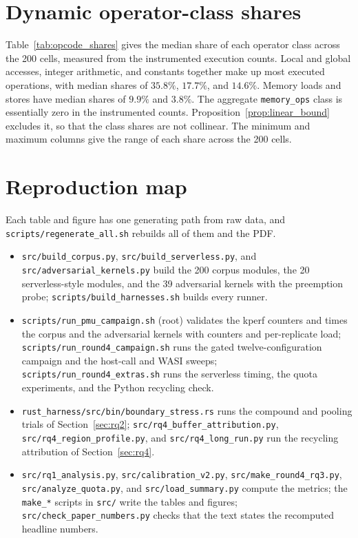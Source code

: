 \documentclass{ws-jcsc}
\begin{document}


\section{Dynamic operator-class shares}\label{app:opcodes}
Table~\ref{tab:opcode_shares} gives the median share of each operator class across the 200 cells, measured from the instrumented execution counts. Local and global accesses, integer arithmetic, and constants together make up most executed operations, with median shares of $35.8\%$, $17.7\%$, and $14.6\%$. Memory loads and stores have median shares of $9.9\%$ and $3.8\%$. The aggregate \texttt{memory\_ops} class is essentially zero in the instrumented counts. Proposition~\ref{prop:linear_bound} excludes it, so that the class shares are not collinear. The minimum and maximum columns give the range of each share across the 200 cells.



\section{Reproduction map}\label{app:repro}
Each table and figure has one generating path from raw data, and \texttt{scripts/regenerate\_all.sh} rebuilds all of them and the PDF.
{\sloppy
\begin{itemize}
\item \texttt{src/build\_corpus.py}, \texttt{src/build\_serverless.py}, and \texttt{src/adversarial\_kernels.py} build the 200 corpus modules, the 20 serverless-style modules, and the 39 adversarial kernels with the preemption probe; \texttt{scripts/build\_harnesses.sh} builds every runner.
\item \texttt{scripts/run\_pmu\_campaign.sh} (root) validates the kperf counters and times the corpus and the adversarial kernels with counters and per-replicate load; \texttt{scripts/run\_round4\_campaign.sh} runs the gated twelve-configuration campaign and the host-call and WASI sweeps; \texttt{scripts/run\_round4\_extras.sh} runs the serverless timing, the quota experiments, and the Python recycling check.
\item \texttt{rust\_harness/src/bin/boundary\_stress.rs} runs the compound and pooling trials of Section~\ref{sec:rq2}; \texttt{src/rq4\_buffer\_attribution.py}, \texttt{src/rq4\_region\_profile.py}, and \texttt{src/rq4\_long\_run.py} run the recycling attribution of Section~\ref{sec:rq4}.
\item \texttt{src/rq1\_analysis.py}, \texttt{src/calibration\_v2.py}, \texttt{src/make\_round4\_rq3.py}, \texttt{src/analyze\_quota.py}, and \texttt{src/load\_summary.py} compute the metrics; the \texttt{make\_*} scripts in \texttt{src/} write the tables and figures; \texttt{src/check\_paper\_numbers.py} checks that the text states the recomputed headline numbers.
\end{itemize}
}
\end{document}
